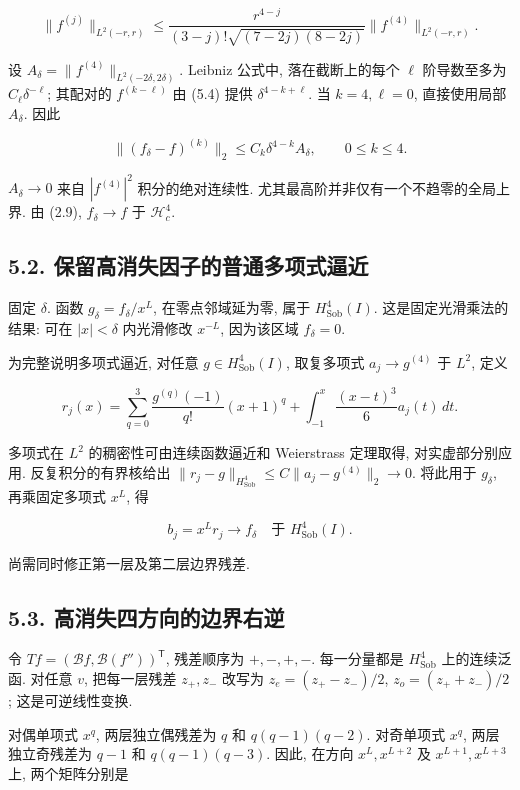 \documentclass[UTF8,fontset=fandol,11pt,a4paper]{ctexart}
\begin{document}
\[
 \|f^{(j)}\|_{L^2(-r,r)}
 \le
 \frac{r^{4-j}}{(3-j)!\sqrt{(7-2j)(8-2j)}}
 \|f^{(4)}\|_{L^2(-r,r)}.
 \tag{5.4}
\]


设 \(A_\delta=\|f^{(4)}\|_{L^2(-2\delta,2\delta)}\).
Leibniz 公式中, 落在截断上的每个 \(\ell\) 阶导数至多为 \(C_\ell\delta^{-\ell}\); 其配对的 \(f^{(k-\ell)}\) 由 (5.4) 提供 \(\delta^{4-k+\ell}\).
当 \(k=4,\ell=0\), 直接使用局部 \(A_\delta\). 因此


\[
 \|(f_\delta-f)^{(k)}\|_2
 \le C_k\delta^{4-k}A_\delta,\qquad 0\le k\le4.
 \tag{5.5}
\]


\(A_\delta\to0\) 来自 \(|f^{(4)}|^2\) 积分的绝对连续性. 尤其最高阶并非仅有一个不趋零的全局上界. 由 (2.9), \(f_\delta\to f\) 于 \(\mathcal H_c^4\).


\subsection*{5.2. 保留高消失因子的普通多项式逼近}

固定 \(\delta\). 函数 \(g_\delta=f_\delta/x^L\), 在零点邻域延为零, 属于 \(H_{\mathrm{Sob}}^4(I)\). 这是固定光滑乘法的结果: 可在 \(|x|<\delta\) 内光滑修改 \(x^{-L}\), 因为该区域 \(f_\delta=0\).


为完整说明多项式逼近, 对任意 \(g\in H_{\mathrm{Sob}}^4(I)\), 取复多项式 \(a_j\to g^{(4)}\) 于 \(L^2\), 定义


\[
 r_j(x)=\sum_{q=0}^3\frac{g^{(q)}(-1)}{q!}(x+1)^q
        +\int_{-1}^x\frac{(x-t)^3}{6}a_j(t)\,dt.
 \tag{5.6}
\]


多项式在 \(L^2\) 的稠密性可由连续函数逼近和 Weierstrass 定理取得, 对实虚部分别应用. 反复积分的有界核给出
\(\|r_j-g\|_{H_{\mathrm{Sob}}^4}\le C\|a_j-g^{(4)}\|_2\to0\).
将此用于 \(g_\delta\), 再乘固定多项式 \(x^L\), 得


\[
 b_j=x^Lr_j\to f_\delta\quad\text{于 }H_{\mathrm{Sob}}^4(I).
 \tag{5.7}
\]


尚需同时修正第一层及第二层边界残差.


\subsection*{5.3. 高消失四方向的边界右逆}

令 \(T f=(\mathcal Bf,\mathcal B(f''))^{\mathsf T}\), 残差顺序为 \(+,-,+,-\). 每一分量都是 \(H_{\mathrm{Sob}}^4\) 上的连续泛函. 对任意 \(v\), 把每一层残差 \(z_+,z_-\) 改写为
\(z_e=(z_+-z_-)/2\), \(z_o=(z_++z_-)/2\); 这是可逆线性变换.


对偶单项式 \(x^q\), 两层独立偶残差为 \(q\) 和 \(q(q-1)(q-2)\).
对奇单项式 \(x^q\), 两层独立奇残差为 \(q-1\) 和 \(q(q-1)(q-3)\).
因此, 在方向 \(x^L,x^{L+2}\) 及 \(x^{L+1},x^{L+3}\) 上, 两个矩阵分别是
\end{document}

